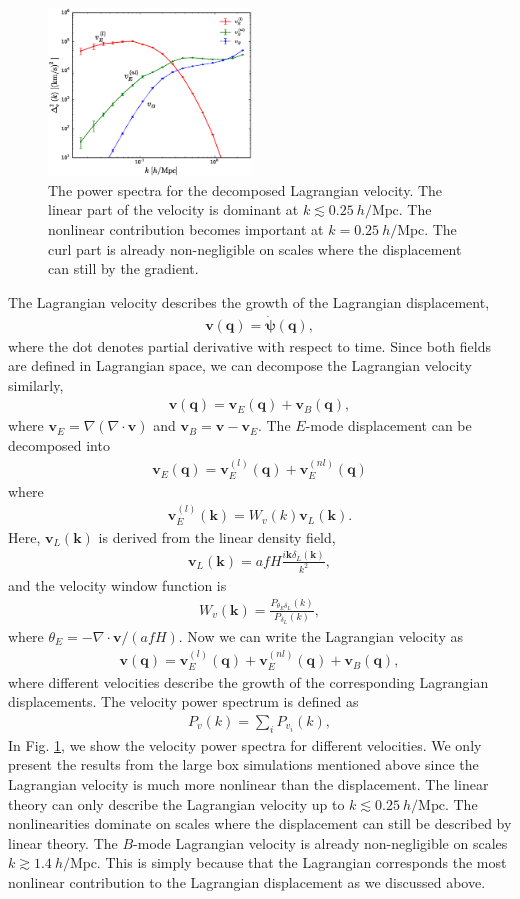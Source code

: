 \documentclass[aps,prx,twocolumn,superscriptaddress,groupedaddress,nofootinbib,amsfont]{revtex4}  %
\newcommand{\mr}{\mathrm}
\newcommand{\bea}{\begin{eqnarray}}
\newcommand{\eea}{\end{eqnarray}}
\newcommand{\bmp}{\bm{\psi}}
\newcommand{\bmv}{\bm{v}}
\newcommand{\bmk}{\bm{k}}
\newcommand{\bmq}{\bm{q}}
\begin{document}
\begin{figure}[tbp]
\begin{center}
\includegraphics[width=0.48\textwidth]{f5.eps}
\end{center}
\vspace{-0.7cm}
\caption{The power spectra for the decomposed Lagrangian velocity. The linear
    part of the velocity is dominant at $k\lesssim0.25\ h/\mr{Mpc}$. 
    The nonlinear contribution becomes important at $k=0.25\ h/\mr{Mpc}$. 
    The curl part is already non-negligible on scales where the displacement 
    can still by the gradient.}
\label{fig:pk_vel}
\end{figure}

The Lagrangian velocity describes the growth of the Lagrangian displacement,
\bea
\bmv(\bmq)=\dot{\bmp}(\bmq),
\eea
where the dot denotes partial derivative with respect to time.
Since both fields are defined in Lagrangian space, we can decompose the 
Lagrangian velocity similarly,
\bea
\bmv(\bmq)=\bmv_E(\bmq)+\bmv_B(\bmq),
\eea
where $\bmv_E=\nabla(\nabla\cdot\bmv)$ and $\bmv_B=\bmv-\bmv_E$. 
The $E$-mode displacement can be decomposed into
\bea
\bmv_E(\bmq)=\bmv_E^{(l)}(\bmq)+\bmv_E^{(nl)}(\bmq)
\eea
where 
\bea
\bmv_E^{(l)}(\bmk)=W_v(k)\bmv_L(\bmk).
\eea
Here, $\bmv_L(\bmk)$ is derived from the linear density field,
\bea
\bmv_L(\bmk)=afH\frac{i\bmk\delta_L(\bmk)}{k^2},
\eea
and the velocity window function is 
\bea
W_v(\bmk)=\frac{P_{\theta_E\delta_L}(k)}{P_{\delta_L}(k)},
\eea
where $\theta_E=-\nabla\cdot\bmv/(afH)$. 
Now we can write the Lagrangian velocity as
\bea
\bmv(\bmq)=\bmv_E^{(l)}(\bmq)+\bmv_E^{(nl)}(\bmq)+\bmv_B(\bmq),
\eea
where different velocities describe the growth of the corresponding Lagrangian displacements.
The velocity power spectrum is defined as
\bea
P_v(k)=\sum_iP_{v_i}(k),
\eea
In Fig. \ref{fig:pk_vel}, we show the velocity power spectra for different velocities. We only present the results from the large box simulations mentioned above since the Lagrangian velocity is much more nonlinear than the displacement.
The linear theory can only describe the Lagrangian velocity up to $k\lesssim0.25\ h/\mr{Mpc}$. The nonlinearities dominate on scales where the displacement can 
still be described by linear theory. The $B$-mode Lagrangian velocity is already
non-negligible on scales $k\gtrsim1.4\ h/\mr{Mpc}$. 
This is simply because that the Lagrangian corresponds the most nonlinear 
contribution to the Lagrangian displacement as we discussed above. 
\end{document}
